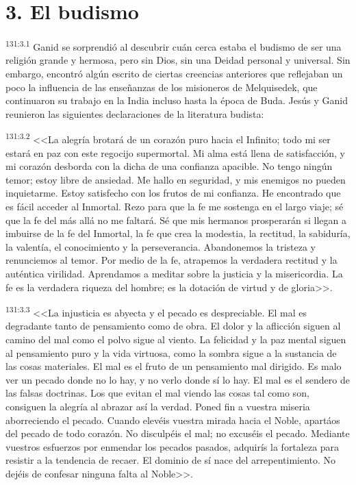\section*{3. El budismo}
\par 
\textsuperscript{131:3.1} Ganid se sorprendió al descubrir cuán cerca estaba el budismo de ser una religión grande y hermosa, pero sin Dios, sin una Deidad personal y universal. Sin embargo, encontró algún escrito de ciertas creencias anteriores que reflejaban un poco la influencia de las enseñanzas de los misioneros de Melquisedek, que continuaron su trabajo en la India incluso hasta la época de Buda. Jesús y Ganid reunieron las siguientes declaraciones de la literatura budista:

\par 
\textsuperscript{131:3.2} <<La alegría brotará de un corazón puro hacia el Infinito; todo mi ser estará en paz con este regocijo supermortal. Mi alma está llena de satisfacción, y mi corazón desborda con la dicha de una confianza apacible. No tengo ningún temor; estoy libre de ansiedad. Me hallo en seguridad, y mis enemigos no pueden inquietarme. Estoy satisfecho con los frutos de mi confianza. He encontrado que es fácil acceder al Inmortal. Rezo para que la fe me sostenga en el largo viaje; sé que la fe del más allá no me faltará. Sé que mis hermanos prosperarán si llegan a imbuirse de la fe del Inmortal, la fe que crea la modestia, la rectitud, la sabiduría, la valentía, el conocimiento y la perseverancia. Abandonemos la tristeza y renunciemos al temor. Por medio de la fe, atrapemos la verdadera rectitud y la auténtica virilidad. Aprendamos a meditar sobre la justicia y la misericordia. La fe es la verdadera riqueza del hombre; es la dotación de virtud y de gloria>>.

\par 
\textsuperscript{131:3.3} <<La injusticia es abyecta y el pecado es despreciable. El mal es degradante tanto de pensamiento como de obra. El dolor y la aflicción siguen al camino del mal como el polvo sigue al viento. La felicidad y la paz mental siguen al pensamiento puro y la vida virtuosa, como la sombra sigue a la sustancia de las cosas materiales. El mal es el fruto de un pensamiento mal dirigido. Es malo ver un pecado donde no lo hay, y no verlo donde sí lo hay. El mal es el sendero de las falsas doctrinas. Los que evitan el mal viendo las cosas tal como son, consiguen la alegría al abrazar así la verdad. Poned fin a vuestra miseria aborreciendo el pecado. Cuando elevéis vuestra mirada hacia el Noble, apartáos del pecado de todo corazón. No disculpéis el mal; no excuséis el pecado. Mediante vuestros esfuerzos por enmendar los pecados pasados, adquirís la fortaleza para resistir a la tendencia de recaer. El dominio de sí nace del arrepentimiento. No dejéis de confesar ninguna falta al Noble>>.

